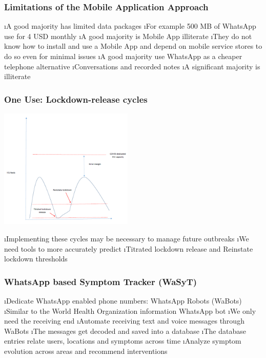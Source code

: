 \documentclass[t,xcolor=pdftex,dvipsnames,table]{beamer}
\begin{document}
\begin{wideframe}
  \frametitle{Limitations of the Mobile Application Approach} 
  \be
  \i A good majority has limited data packages
  \be \i  For example 500 MB of WhatsApp use for 4 USD monthly \ee 
\i  A good majority is Mobile App illiterate
\be 
\i  They do not know how to install and use a Mobile App and depend on
mobile service stores to do so even for minimal issues
\ee 
\i  A good majority use WhatsApp as a cheaper telephone alternative
\be \i  Conversations and recorded notes \ee 
\i  A significant majority is illiterate
  \ee

\end{wideframe} 



\begin{wideframe}
  \frametitle{One Use: Lockdown-release cycles} 
  \includegraphics[width=.8\textwidth,height=5.7cm]{jpgs/lockdown_release}

  \be
  \i Implementing these cycles may be necessary to manage future outbreaks
  \i We need tools to more accurately predict
    \be \i Titrated lockdown release and Reinstate lockdown thresholds \ee 
  \ee
\end{wideframe} 




\begin{wideframe}
  \frametitle{WhatsApp based Symptom Tracker (WaSyT)} 

  \be
  \i Dedicate WhatsApp enabled phone numbers: WhatsApp Robots (WaBots)
  \be \i Similar to the World Health Organization information WhatsApp bot
      \i We only need the receiving end
      \ee 
  \i Automate receiving text and voice messages through WaBots
  \be \i The messages get decoded and saved into a database
      \i The database entries relate users, locations and symptoms across time
      \ee
  \i Analyze symptom evolution across areas and recommend interventions
  \ee
\end{wideframe} 
\end{document}
